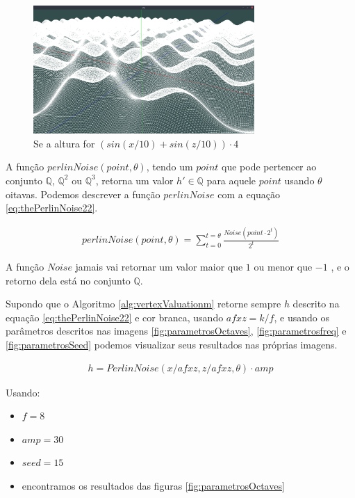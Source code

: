 \begin{figure}[H]
    \centering
    \includegraphics[width=0.75\textwidth]{figuras/sssins.png}
    \caption{Se a altura for $(sin(x/10) + sin(z/10)) \cdot 4$}
    \label{fig:sssins}
\end{figure}

A função $perlinNoise(point, \theta)$, tendo um $point$ que pode pertencer ao
conjunto $\mathbb{Q}$, $\mathbb{Q}^{2}$ ou $\mathbb{Q}^{3}$, retorna um valor $h' \in \mathbb{Q}$ para aquele $point$
usando $\theta$ oitavas. Podemos descrever a função $perlinNoise$ com a equação \ref{eq:thePerlinNoise22}.

\begin{equation}\label{eq:thePerlinNoise22}
  \begin{split}
    perlinNoise(point, \theta) = \sum_{t=0}^{t=\theta} \frac{Noise(point \cdot 2^{t})}{2^{t}}
  \end{split}
\end{equation}

A função $Noise$ jamais vai retornar um valor maior que $1$ ou menor que $-1$ \cite{perlin1985image}, e o retorno dela
está no conjunto $\mathbb{Q}$.

Supondo que o Algoritmo \ref{alg:vertexValuationm} retorne sempre $h$ descrito na equação \ref{eq:thePerlinNoise22}
e cor branca, usando $afxz = k/f$, e usando os parâmetros descritos nas imagens \ref{fig:parametrosOctaves},
\ref{fig:parametrosfreq} e \ref{fig:parametrosSeed} podemos visualizar seus resultados nas próprias imagens.

\begin{equation}\label{eq:thePerlinNoise22}
  \begin{split}
    h = PerlinNoise(x/afxz, z/afxz, \theta) \cdot amp
  \end{split}
\end{equation}

Usando:
\begin{itemize}
    \item $f = 8$
    \item $amp = 30$
    \item $seed = 15$
    \item encontramos os resultados das figuras \ref{fig:parametrosOctaves}
\end{itemize}

